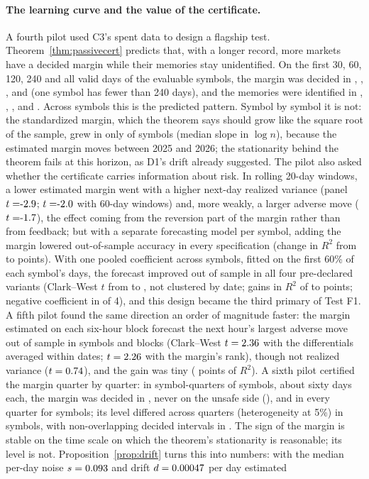 \paragraph{The learning curve and the value of the certificate.} A fourth pilot used C3's spent data to design a flagship test. Theorem~\ref{thm:passivecert} predicts that, with a longer record, more markets have a decided margin while their memories stay unidentified. On the first 30, 60, 120, 240 and all valid days of the \PfourSymbols{} evaluable symbols, the margin was decided in \PfourDecThirty{}, \PfourDecSixty{}, \PfourDecOneTwenty{}, \PfourDecTwoForty{} and \PfourDecAll{} (one symbol has fewer than 240 days), and the memories were identified in \PfourIdThirty{}, \PfourIdSixty{}, \PfourIdOneTwenty{}, \PfourIdTwoForty{} and \PfourIdAll{}. Across symbols this is the predicted pattern. Symbol by symbol it is not: the standardized margin, which the theorem says should grow like the square root of the sample, grew in only \PfourSlopePos{} of \PfourSymbols{} symbols (median slope \PfourSlope{} in $\log n$), because the estimated margin moves between 2025 and 2026; the stationarity behind the theorem fails at this horizon, as D1's drift already suggested. The pilot also asked whether the certificate carries information about risk. In rolling 20-day windows, a lower estimated margin went with a higher next-day realized variance (panel $t=\PfourTrv$; $t=\PfourTrvSixty$ with 60-day windows) and, more weakly, a larger adverse move ($t=\PfourTmae$), the effect coming from the reversion part of the margin rather than from feedback; but with a separate forecasting model per symbol, adding the margin lowered out-of-sample accuracy in every specification (change in $R^2$ from \PfourOosLo{} to \PfourOosHi{} points). With one pooled coefficient across symbols, fitted on the first 60\% of each symbol's days, the forecast improved out of sample in all four pre-declared variants (Clark--West $t$ from \PfourbTlo{} to \PfourbThi{}, not clustered by date; gains in $R^2$ of \PfourbGlo{} to \PfourbGhi{} points; negative coefficient in \PfourbNeg{} of 4), and this design became the third primary of Test F1. A fifth pilot found the same direction an order of magnitude faster: the margin estimated on each six-hour block forecast the next hour's largest adverse move out of sample in \PfiveSymbols{} symbols and \PfiveBlocks{} blocks (Clark--West $t=2.36$ with the differentials averaged within dates; $t=2.26$ with the margin's rank), though not realized variance ($t=0.74$), and the gain was tiny (\PfiveG{} points of $R^2$). A sixth pilot certified the margin quarter by quarter: in \PsixSQ{} symbol-quarters of \PsixSymbols{} symbols, about sixty days each, the margin was decided in \PsixDecided{}, never on the unsafe side (\PsixUnsafe{}), and in every quarter for \PsixEvery{} symbols; its level differed across quarters (heterogeneity at 5\%) in \PsixHet{} symbols, with non-overlapping decided intervals in \PsixDisjoint{}. The sign of the margin is stable on the time scale on which the theorem's stationarity is reasonable; its level is not. Proposition~\ref{prop:drift} turns this into numbers: with the median per-day noise $s=0.093$ and drift $d=0.00047$ per day estimated 